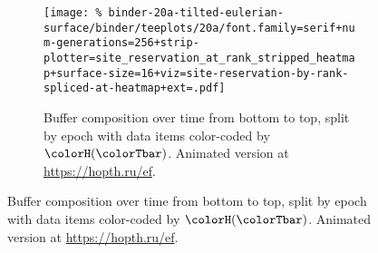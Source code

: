 \begin{figure}[htbp!]
\begin{subfigure}[b]{\linewidth}
\texttt{[image: \%
binder-20a-tilted-eulerian-surface/binder/teeplots/20a/font.family=serif+num-generations=256+strip-plotter=site\_reservation\_at\_rank\_stripped\_heatmap+surface-size=16+viz=site-reservation-by-rank-spliced-at-heatmap+ext=.pdf]}
\vspace{-4.5ex}\caption{\footnotesize
  Buffer composition over time from bottom to top, split by epoch with data items color-coded by \hv{} $\colorH(\colorTbar)$.
  Animated version at \url{https://hopth.ru/ef}.
}
\label{fig:hsurf-tilted-implementation-schematic}
\end{subfigure}




\end{figure}
